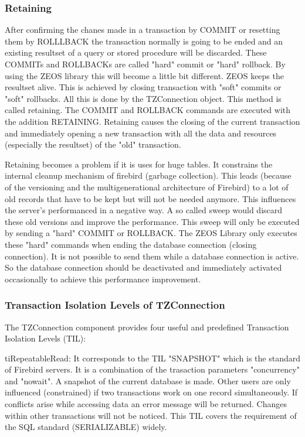 \documentclass[a4paper,12pt,oneside]{book}
\begin{document}
\subsubsection{Retaining}
After confirming the chanes made in a transaction by COMMIT or resetting them by ROLLLBACK the
transaction normally is going to be ended and an existing resultset of a query or stored procedure will be discarded.
These COMMITs and ROLLBACKs are called "hard" commit or "hard" rollback.
By using the ZEOS library this will become a little bit different.
ZEOS keeps the resultset alive.
This is achieved by closing transaction with "soft" commits or "soft" rollbacks.
All this is done by the TZConnection object.
This method is called retaining.
The COMMIT and ROLLBACK commands are executed with the addition RETAINING.
Retaining causes the closing of the current transaction and immediately opening a new transaction with all the data and resources (especially the resultset) of the "old" transaction.

Retaining becomes a problem if it is uses for huge tables.
It constrains the internal cleanup mechanism of firebird (garbage collection).
This leads (because of the versioning and the multigenerational architecture of Firebird) to a lot of old records that have to be kept but will not be needed anymore.
This influences the server's performanced in a negative way.
A so called sweep would discard these old versions and improve the performance.
This sweep will only be executed by sending a "hard" COMMIT or ROLLBACK.
The ZEOS Library only executes these "hard" commands when ending the database connection (closing connection).
It is not possible to send them while a database connection is active. So the database connection should be deactivated and immediately activated occasionally to achieve this performance improvement.

\subsubsection{Transaction Isolation Levels of TZConnection}

The TZConnection component provides four useful and predefined Transaction Isolation Levels (TIL):

tiRepeatableRead:
It corresponds to the TIL "SNAPSHOT" which is the standard of Firebird servers.
It is a combination of the trasaction parameters "concurrency" and "nowait".
A snapshot of the current database is made.
Other users are only influenced (constrained) if two transactions work on one record simultaneously.
If conflicts arise while accessing data an error message will be returned.
Changes within other transactions will not be noticed.
This TIL covers the requirement of the SQL standard (SERIALIZABLE) widely.
\end{document}
